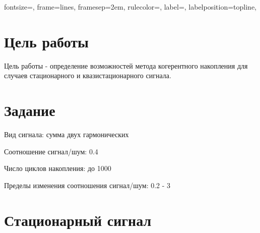 
\isnametrue
\def \labnum {1}
\def \labsubj {Методы обработки цифровых сигналов}
\def \labauthor {Чебыкин И. Б.}
\def \labgroup {P3401}
\def \labinsp {Тропченко А. А.}
\def \labname {Вариант 12}

\usepackage{graphicx,tabularx}

\usepackage{caption}
\usepackage{verbatim}
\usepackage[dvipsnames]{xcolor}

\usepackage{fancyvrb}

 {
 fontsize=\scriptsize,
 frame=lines,  %
 framesep=2em, %
 rulecolor=\color{Gray},
 label=,
 labelposition=topline,
}

\captionsetup{labelsep=period}
\pagestyle{fancy}


\section{Цель работы}
Цель работы - определение возможностей метода когерентного накопления
для случаев стационарного и квазистационарного сигнала.
\section{Задание}

Вид сигнала: сумма двух гармонических

Соотношение сигнал/шум: 0.4

Число циклов накопления: до 1000

Пределы изменения соотношения сигнал/шум: 0.2 - 3

\section{Стационарный сигнал}
